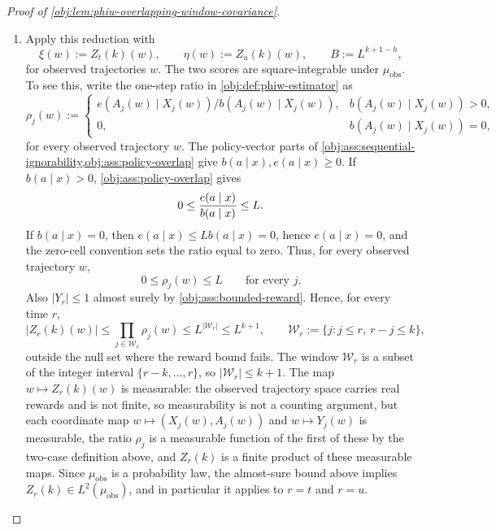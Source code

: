 \begin{proof}[Proof of \cref{obj:lem:phiw-overlapping-window-covariance}]
\begin{enumerate}
\item Apply this reduction with
\[
\xi(w):=Z_t(k)(w),
\qquad
\eta(w):=Z_u(k)(w),
\qquad
B:=L^{k+1-h},
\]
for observed trajectories \(w\). The two scores are square-integrable under \(\mu_{\mathrm{obs}}\). To see this, write the one-step ratio in \cref{obj:def:phiw-estimator} as
\[
\rho_j(w)
:=
\begin{cases}
 e(A_j(w)\mid X_j(w))/b(A_j(w)\mid X_j(w)),& b(A_j(w)\mid X_j(w))>0,\\
 0,& b(A_j(w)\mid X_j(w))=0,
\end{cases}
\]
for every observed trajectory \(w\). The policy-vector parts of \cref{obj:ass:sequential-ignorability,obj:ass:policy-overlap} give \(b(a\mid x),e(a\mid x)\ge 0\). If \(b(a\mid x)>0\), \cref{obj:ass:policy-overlap} gives
\[
0\le {e(a\mid x)\over b(a\mid x)}\le L .
\]
If \(b(a\mid x)=0\), then \(e(a\mid x)\le Lb(a\mid x)=0\), hence \(e(a\mid x)=0\), and the zero-cell convention sets the ratio equal to zero. Thus, for every observed trajectory \(w\),
\[
0\le \rho_j(w)\le L
\qquad\text{for every }j .
\]
Also \(|Y_r|\le 1\) almost surely by \cref{obj:ass:bounded-reward}. Hence, for every time \(r\),
\[
|Z_r(k)(w)|
\le
\prod_{j\in\mathcal W_r}\rho_j(w)
\le
L^{|\mathcal W_r|}
\le
L^{k+1},
\qquad
\mathcal W_r:=\{j: j\le r,\ r-j\le k\},
\]
outside the null set where the reward bound fails. The window \(\mathcal W_r\) is a subset of the integer interval \(\{r-k,\ldots,r\}\), so \(|\mathcal W_r|\le k+1\). The map \(w\mapsto Z_r(k)(w)\) is measurable: the observed trajectory space carries real rewards and is not finite, so measurability is not a counting argument, but each coordinate map \(w\mapsto(X_j(w),A_j(w))\) and \(w\mapsto Y_j(w)\) is measurable, the ratio \(\rho_j\) is a measurable function of the first of these by the two-case definition above, and \(Z_r(k)\) is a finite product of these measurable maps. Since \(\mu_{\mathrm{obs}}\) is a probability law, the almost-sure bound above implies \(Z_r(k)\in L^2(\mu_{\mathrm{obs}})\), and in particular it applies to \(r=t\) and \(r=u\).


\end{enumerate}
\end{proof}
